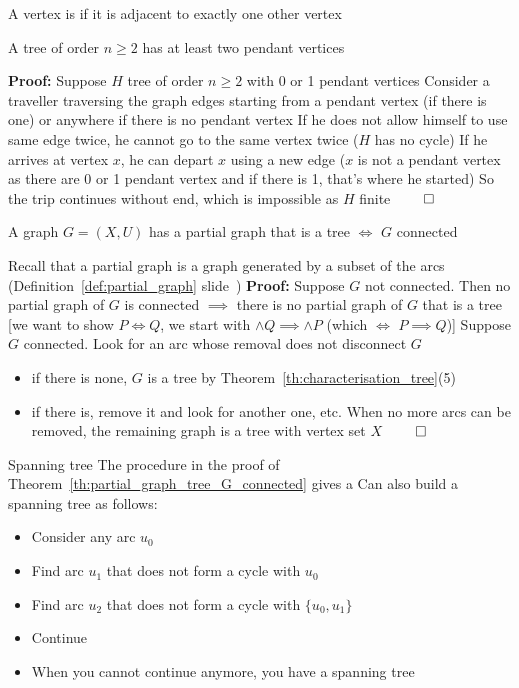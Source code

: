 \documentclass[aspectratio=43]{beamer}
\begin{document}
\begin{frame}
\begin{definition}
A vertex is  if it is adjacent to exactly one other vertex
\end{definition}
\vfill
\begin{theorem}
A tree of order $n\geq 2$ has at least two pendant vertices
\end{theorem}
\vfill
\textbf{Proof:} 
Suppose $H$ tree of order $n\geq 2$ with 0 or 1 pendant vertices
\vskip0.5cm
Consider a traveller traversing the graph edges starting from a pendant vertex (if there is one) or anywhere if there is no pendant vertex
\vskip0.5cm
If he does not allow himself to use same edge twice, he cannot go to the same vertex twice ($H$ has no cycle)
\vskip0.5cm
If he arrives at vertex $x$, he can depart $x$ using a new edge ($x$ is not a pendant vertex as there are 0 or 1 pendant vertex and if there is 1, that's where he started)
\vskip0.5cm
So the trip continues without end, which is impossible as $H$ finite $\qed$
\end{frame}

\begin{frame}
\begin{theorem}\label{th:partial_graph_tree_G_connected}
A graph $G=(X,U)$ has a partial graph that is a tree $\iff$ $G$ connected
\end{theorem}
\vfill
Recall that a partial graph is a graph generated by a subset of the arcs (Definition~\ref{def:partial_graph} slide~\pageref{def:partial_graph})
\vfill
\textbf{Proof:}
Suppose $G$ not connected. Then no partial graph of $G$ is connected $\implies$ there is no partial graph of $G$ that is a tree [we want to show $P\iff Q$, we start with $\wedge Q\implies \wedge P$ (which $\iff$ $P\implies Q$)]
\vskip1cm
Suppose $G$ connected. Look for an arc whose removal does not disconnect $G$
\begin{itemize}
\item if there is none, $G$ is a tree by Theorem~\ref{th:characterisation_tree}(5)
\item if there is, remove it and look for another one, etc. When no more arcs can be removed, the remaining graph is a tree with vertex set $X$ $\qed$
\end{itemize}
\end{frame}

\begin{frame}{Spanning tree}
The procedure in the proof of Theorem~\ref{th:partial_graph_tree_G_connected} gives a 
\vfill
Can also build a spanning tree as follows:
\begin{itemize}
\item Consider any arc $u_0$
\item Find arc $u_1$ that does not form a cycle with $u_0$
\item Find arc $u_2$ that does not form a cycle with $\{u_0,u_1\}$
\item Continue
\item When you cannot continue anymore, you have a spanning tree
\end{itemize}
\end{frame}
\end{document}
